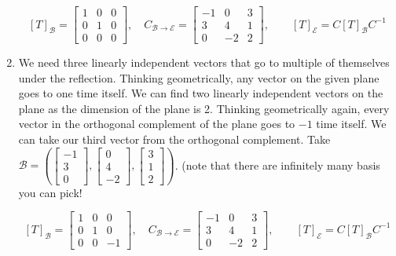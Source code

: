 \begin{SaveQuestion}
\begin{enumerate}
     \[
[T]_\mathcal B=\begin{bmatrix}
    1&0&0\\0&1&0\\0&0&0
\end{bmatrix},\quad C_{\mathcal B\to \mathcal E}= \begin{bmatrix}
    -1&0&3\\3&4&1\\0&-2&2
\end{bmatrix},\quad \quad [T]_\mathcal E=C[T]_{\mathcal B}C^{-1}
    \]
    \item We need three linearly independent vectors that go to multiple of themselves under the reflection. Thinking geometrically, any vector on the given plane goes to one time itself. We can find two linearly independent vectors on the plane as the dimension of the plane is 2. Thinking geometrically again, every vector in the orthogonal complement of the plane goes to $-1$ time itself. We can take our third vector from the orthogonal complement.  Take $\mathcal B=(\begin{bmatrix}
        -1\\3\\0
    \end{bmatrix}, \begin{bmatrix}
        0\\4\\-2
    \end{bmatrix},\begin{bmatrix}
        3\\1\\2
    \end{bmatrix} )$. (note that there are infinitely many basis you can pick!

     \[
[T]_\mathcal B=\begin{bmatrix}
    1&0&0\\0&1&0\\0&0&-1
\end{bmatrix},\quad C_{\mathcal B\to \mathcal E}= \begin{bmatrix}
    -1&0&3\\3&4&1\\0&-2&2
\end{bmatrix},\quad \quad [T]_\mathcal E=C[T]_{\mathcal B}C^{-1}
    \]
    \end{enumerate}
\end{SaveQuestion}


